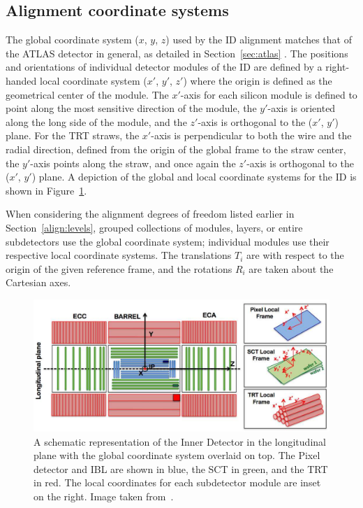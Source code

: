\subsection{Alignment coordinate systems}\label{align:coords}
The global coordinate system ($x$, $y$, $z$) used by the ID alignment matches that of the ATLAS detector in general, as detailed in Section~\ref{sec:atlas} .
The positions and orientations of individual detector modules of the ID are defined by a right-handed local coordinate system ($x'$, $y'$, $z'$) where the origin is defined as the geometrical center of the module.
The $x'$-axis for each silicon module is defined to point along the most sensitive direction of the module, the $y'$-axis is oriented along the long side of the module, and the $z'$-axis is orthogonal to the ($x'$, $y'$) plane.
For the TRT straws, the $x'$-axis is perpendicular to both the wire and the radial direction, defined from the origin of the global frame to the straw center, the $y'$-axis points along the straw, and once again the $z'$-axis is orthogonal to the ($x'$, $y'$) plane.
A depiction of the global and local coordinate systems for the ID is shown in Figure~\ref{fig:align_coords}.

When considering the alignment degrees of freedom listed earlier in Section~\ref{align:levels}, grouped collections of modules, layers, or entire subdetectors use the global coordinate system; individual modules use their respective local coordinate systems.
The translations $T_i$ are with respect to the origin of the given reference frame, and the rotations $R_i$ are taken about the Cartesian axes.

\begin{figure}
  \centering
  \includegraphics[width=.8\textwidth]{figs/alignment/ReferenceFrame}
  \caption[A schematic representation of the Inner Detector in the longitudinal plane with the global coordinate system overlaid on top.  The Pixel detector and IBL are shown in blue, the SCT in green, and the TRT in red.  The local coordinates for each subdetector module are inset on the right.]{A schematic representation of the Inner Detector in the longitudinal plane with the global coordinate system overlaid on top.  The Pixel detector and IBL are shown in blue, the SCT in green, and the TRT in red.  The local coordinates for each subdetector module are inset on the right.  Image taken from~\cite{2015.alignment-2015-cosmic}.}
  \label{fig:align_coords}
\end{figure}
